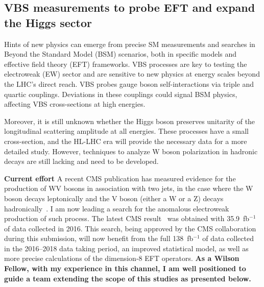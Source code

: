 {\begin{flushleft}
\section{VBS measurements to probe EFT and expand the Higgs sector}
\vskip 5pt

Hints of new physics can emerge from precise SM measurements and searches in Beyond the Standard Model (BSM) scenarios, both in specific models and effective field theory (EFT) frameworks. VBS processes are key to testing the electroweak (EW) sector and are sensitive to new physics at energy scales beyond the LHC’s direct reach. VBS probes gauge boson self-interactions via triple and quartic couplings. Deviations in these couplings could signal BSM physics, affecting VBS cross-sections at high energies. 

Moreover, it is still unknown whether the Higgs boson preserves unitarity of the longitudinal scattering amplitude at all energies. These processes have a small cross-section, and the HL-LHC era will provide the necessary data for a more detailed study. However, techniques to analyze W boson polarization in hadronic decays are still lacking and need to be developed.

\textbf{Current effort}
A recent CMS publication has measured evidence for the production of WV bosons in association with two jets, in the case where the W boson decays leptonically and the V boson (either a W or a Z) decays hadronically~\cite{[1]}. I am now leading a search for the anomalous electroweak production of such process. The latest CMS result~\cite{[2]} was obtained with 35.9~fb$^{-1}$ of data collected in 2016. This search, being approved by the CMS collaboration during this submission, will now benefit from the full 138~fb$^{-1}$ of data collected in the 2016--2018 data taking period, an improved statistical model, as well as more precise calculations of the dimension-8 EFT operators. {\bf As a Wilson Fellow, with my experience in this channel, I am well positioned to guide a team extending the scope of this studies as presented below.}


\end{flushleft}}
